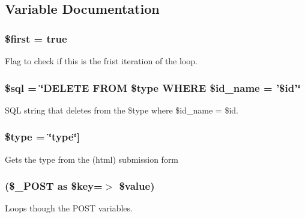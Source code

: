 \subsection{\-Variable \-Documentation}
\hypertarget{remove_8php_ae73c37b326d9d2b977b30454ad893dd6}{
\subsubsection[{\$first}]{\setlength{\rightskip}{0pt plus 5cm}\$first = true}}\label{remove_8php_ae73c37b326d9d2b977b30454ad893dd6}
\-Flag to check if this is the frist iteration of the loop. \hypertarget{remove_8php_a047170d6020a882807665812a27e2525}{
\subsubsection[{\$sql}]{\setlength{\rightskip}{0pt plus 5cm}\$sql = \char`\"{}\-D\-E\-L\-E\-T\-E \-F\-R\-O\-M \$type \-W\-H\-E\-R\-E \$id\-\_\-name = '\$id'\char`\"{}}}\label{remove_8php_a047170d6020a882807665812a27e2525}
\-S\-Q\-L string that deletes from the \$type where \$id\-\_\-name = \$id. \hypertarget{remove_8php_a9a4a6fba2208984cabb3afacadf33919}{
\subsubsection[{\$type}]{\setlength{\rightskip}{0pt plus 5cm}\$type = \char`\"{}type\char`\"{}\mbox{]}}}\label{remove_8php_a9a4a6fba2208984cabb3afacadf33919}
\-Gets the type from the (html) submission form \hypertarget{remove_8php_ac6aafbc4d90cd74f481282f505f6c628}{
\subsubsection[{foreach}]{(\$\-\_\-\-P\-O\-S\-T as \$key=$>$ \$value)}}\label{remove_8php_ac6aafbc4d90cd74f481282f505f6c628}
\-Loops though the \-P\-O\-S\-T variables. \hypertarget{remove_8php_a3ad3a4240c0f97c7e85aff5c52a454d4}{
\subsubsection[{print}]{}}\label{remove_8php_a3ad3a4240c0f97c7e85aff5c52a454d4}
